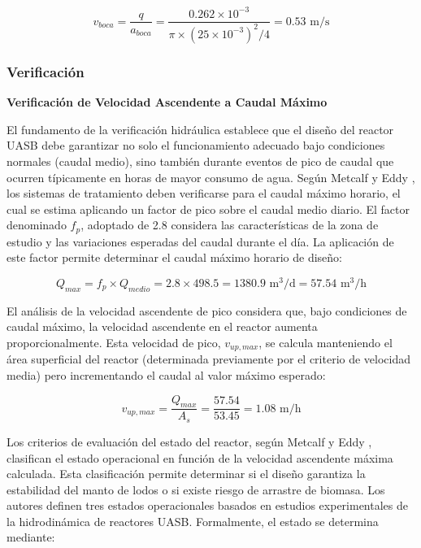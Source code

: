 \documentclass[12pt,a4paper]{article}
\begin{document}
\begin{equation}
v_{boca} = \frac{q}{a_{boca}} = \frac{0.262 \times 10^{-3}}{\pi \times (25 \times 10^{-3})^2 / 4} = 0.53 \text{ m/s}
\end{equation}

\subsubsection{Verificación}

\textbf{Verificación de Velocidad Ascendente a Caudal Máximo}

El fundamento de la verificación hidráulica establece que el diseño del reactor UASB debe garantizar no solo el funcionamiento adecuado bajo condiciones normales (caudal medio), sino también durante eventos de pico de caudal que ocurren típicamente en horas de mayor consumo de agua. Según Metcalf y Eddy \cite{metcalf2014}, los sistemas de tratamiento deben verificarse para el caudal máximo horario, el cual se estima aplicando un factor de pico sobre el caudal medio diario. El factor denominado $f_p$, adoptado de 2.8 considera las características de la zona de estudio y las variaciones esperadas del caudal durante el día. La aplicación de este factor permite determinar el caudal máximo horario de diseño:

\begin{equation}
Q_{max} = f_p \times Q_{medio} = 2.8 \times 498.5 = 1380.9 \text{ m}^3\text{/d} = 57.54 \text{ m}^3\text{/h}
\end{equation}

El análisis de la velocidad ascendente de pico considera que, bajo condiciones de caudal máximo, la velocidad ascendente en el reactor aumenta proporcionalmente. Esta velocidad de pico, $v_{up,max}$, se calcula manteniendo el área superficial del reactor (determinada previamente por el criterio de velocidad media) pero incrementando el caudal al valor máximo esperado:

\begin{equation}
v_{up,max} = \frac{Q_{max}}{A_s} = \frac{57.54}{53.45} = 1.08 \text{ m/h}
\end{equation}

Los criterios de evaluación del estado del reactor, según Metcalf y Eddy \cite{metcalf2014}, clasifican el estado operacional en función de la velocidad ascendente máxima calculada. Esta clasificación permite determinar si el diseño garantiza la estabilidad del manto de lodos o si existe riesgo de arrastre de biomasa. Los autores definen tres estados operacionales basados en estudios experimentales de la hidrodinámica de reactores UASB. Formalmente, el estado se determina mediante:
\end{document}
